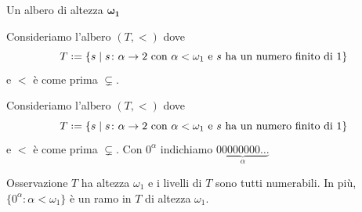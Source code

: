 \documentclass{beamer}
\theoremstyle{num.custom-title}
\theoremstyle{custom-title}
\newcommand*{\defeq}{\mathrel{\rlap{%
                     \raisebox{0.3ex}{$\cdot$}}%
                     \raisebox{-0.3ex}{$\cdot$}}%
                     =}
\begin{document}
\begin{frame}{Un albero di altezza $\pmb{\omega_1}$}


\begin{overprint}
 Consideriamo l'albero $(T,<)$ dove
\[
T \defeq \{s \mid s \colon \alpha \to 2 \text{ con $\alpha < \omega_1$ e $s$ ha un numero finito di 1}\}
\]
e $<$ è come prima $\subsetneq$.

 Consideriamo l'albero $(T,<)$ dove
\[
T \defeq \{s \mid s \colon \alpha \to 2 \text{ con $\alpha < \omega_1$ e $s$ ha un numero finito di 1}\}
\]
e $<$ è come prima $\subsetneq$. Con $0^\alpha$ indichiamo $\underbrace{00000000 \ldots}_{\alpha}$

\begin{alertblock}{Osservazione}
$T$ ha altezza $\omega_1$ e i livelli di $T$ sono tutti numerabili. In più, $\{0^\alpha : \alpha < \omega_1\}$ è un ramo in $T$ di altezza $\omega_1$.
\end{alertblock}
\end{overprint}

\vspace{-15pt}

\end{frame}
\end{document}
